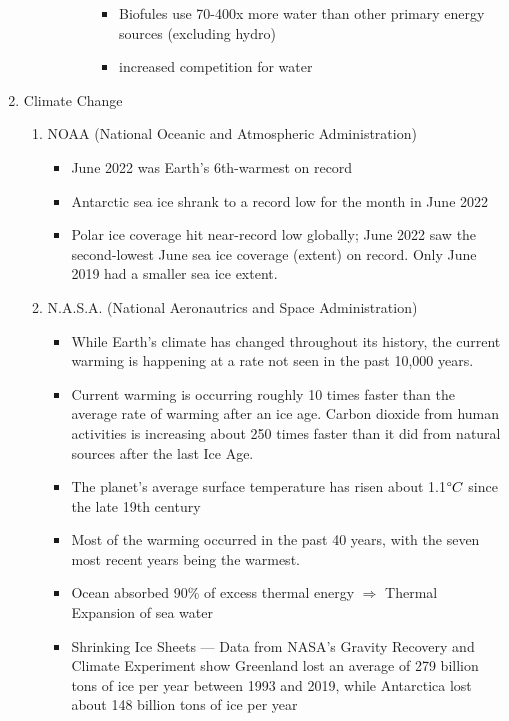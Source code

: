 \documentclass[oneside]{book}
\begin{document}
\begin{enumerate}
\begin{enumerate}
\begin{enumerate}
\begin{itemize}
\begin{itemize}
                    \item Biofules use 70-400x more water than other primary energy sources (excluding hydro)
                    \item increased competition for water
                \end{itemize}
            \end{itemize}
        \end{enumerate}
    \end{enumerate}
    \item Climate Change
    \begin{enumerate}
        \item NOAA (National Oceanic and Atmospheric Administration) \begin{itemize}
            \item June 2022 was Earth’s 6th-warmest on record
            \item Antarctic sea ice shrank to a record low for the month in June 2022
            \item Polar ice coverage hit near-record low globally; June 2022 saw the second-lowest June sea ice coverage (extent) on record. Only June 2019 had a smaller sea ice extent. 
        \end{itemize}
        \item N.A.S.A. (National Aeronautrics and Space Administration) \begin{itemize}
            \item \footnotesize While Earth’s climate has changed throughout its history, \normalsize the current warming is happening at a rate not seen in the past 10,000 years.
            \item Current warming is occurring roughly 10 times faster than the average rate of warming after an ice age. Carbon dioxide from human activities is increasing about 250 times faster than it did from natural sources after the last Ice Age.
            \item The planet's average surface temperature has risen about 1.1\(\text{\degree} C\) since the late 19th century
            \item Most of the warming occurred in the past 40 years, with the seven most recent years being the warmest.
            \item Ocean absorbed 90\% of excess thermal energy \( \Rightarrow \) Thermal Expansion of sea water
            \item Shrinking Ice Sheets --- Data from NASA's Gravity Recovery and Climate Experiment show Greenland lost an average of 279 billion tons of ice per year between 1993 and 2019, while Antarctica lost about 148 billion tons of ice per year

\end{itemize}
\end{enumerate}
\end{enumerate}
\end{document}
